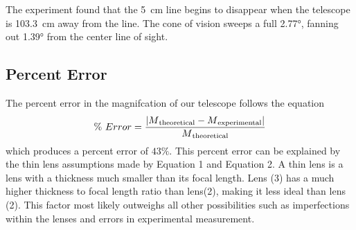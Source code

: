 The experiment found that the \SI{5}{\centi\meter} line begins to disappear when the telescope is \SI{103.3}{\centi\meter} away from the line. The cone of vision sweeps a full \ang{2.77}, fanning out \ang{1.39} from the center line of sight.

\subsection{Percent Error}
The percent error in the magnifcation of our telescope follows the equation
\begin{equation}\label{error}
  \%~Error = \dfrac{|M\textsubscript{theoretical} - M\textsubscript{experimental}|}{M\textsubscript{theoretical}}
\end{equation}
which produces a percent error of $43\%$. This percent error can be explained by the thin lens assumptions made by Equation 1 and Equation 2. A thin lens is a lens with a thickness much smaller than its focal length. Lens (3) has a much higher thickness to focal length ratio than lens(2), making it less ideal than lens (2). This factor most likely outweighs all other possibilities such as imperfections within the lenses and errors in experimental measurement.
